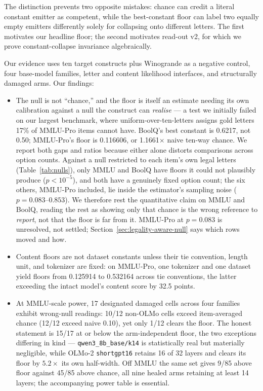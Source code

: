 The distinction prevents two opposite mistakes: chance can credit a literal constant emitter as competent, while the best-constant floor can label two equally empty emitters differently solely for collapsing onto different letters. The first motivates our headline floor; the second motivates read-out v2, for which we prove constant-collapse invariance algebraically.

Our evidence uses ten target constructs plus Winogrande as a negative control, four base-model families, letter and content likelihood interfaces, and structurally damaged arms. Our findings:

\begin{itemize}[leftmargin=*,nosep]
    \item The null is not ``chance,'' and the floor is itself an estimate needing its own calibration against a null the construct can \emph{realise} --- a test we initially failed on our largest benchmark, where uniform-over-ten-letters assigns gold letters 17\% of MMLU-Pro items cannot have. BoolQ's best constant is 0.6217, not 0.50; MMLU-Pro's floor is 0.116606, or 1.1661$\times$ naive ten-way chance. We report both gaps and ratios because either alone distorts comparisons across option counts. Against a null restricted to each item's own legal letters (Table~\ref{tab:nulls}), only MMLU and BoolQ have floors it could not plausibly produce ($p<10^{-5}$), and both have a genuinely fixed option count; the six others, MMLU-Pro included, lie inside the estimator's sampling noise ($p=0.083$--$0.853$). We therefore rest the quantitative claim on MMLU and BoolQ, reading the rest as showing only that chance is the wrong reference to \emph{report}, not that the floor is far from it. MMLU-Pro at $p=0.083$ is unresolved, not settled; Section~\ref{sec:legality-aware-null} says which rows moved and how.
    \item Content floors are not dataset constants unless their tie convention, length unit, and tokenizer are fixed: on MMLU-Pro, one tokenizer and one dataset yield floors from 0.125914 to 0.532164 across tie conventions, the latter exceeding the intact model's content score by 32.5 points.
    \item At MMLU-scale power, 17 designated damaged cells across four families exhibit wrong-null readings: 10/12 non-OLMo cells exceed item-averaged chance (12/12 exceed naive 0.10), yet only 1/12 clears the floor. The honest statement is 15/17 at or below the arm-independent floor, the two exceptions differing in kind --- \texttt{qwen3\_8b\_base/k14} is statistically real but materially negligible, while OLMo-2 \texttt{shortgpt16} retains 16 of 32 layers and clears its floor by $5.2\times$ its own half-width. Off MMLU the same set gives 9/85 above floor against 45/85 above chance, all nine healed arms retaining at least 14 layers; the accompanying power table is essential.

\end{itemize}
